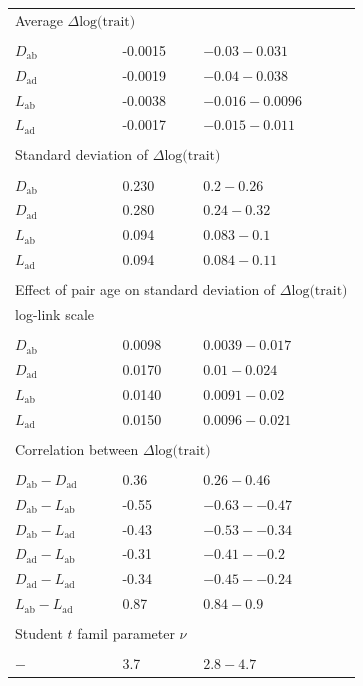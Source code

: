 \documentclass[
  10pt,
]{article}
\begin{document}
\begin{table}[ht]
\begin{center}
\begin{tabular}{lll}
  \multicolumn{3}{l}{Average $\Delta \text{log(trait)}$} \\
  \\
  $D_\mathrm{ab}$ & -0.0015  & $-0.03-0.031$  \\
  $D_\mathrm{ad}$ & -0.0019  & $-0.04-0.038$  \\
  $L_\mathrm{ab}$ & -0.0038  & $-0.016-0.0096$  \\
  $L_\mathrm{ad}$ & -0.0017  & $-0.015-0.011$  \\
  \\
  \multicolumn{3}{l}{Standard deviation of $\Delta \text{log(trait)}$} \\
  \\
  $D_\mathrm{ab}$ & 0.230  & $0.2-0.26$  \\
  $D_\mathrm{ad}$ & 0.280  & $0.24-0.32$  \\
  $L_\mathrm{ab}$ & 0.094  & $0.083-0.1$  \\
  $L_\mathrm{ad}$ & 0.094  & $0.084-0.11$  \\
  \\
  \multicolumn{3}{l}{Effect of pair age on standard deviation of $\Delta \text{log(trait)}$} \\
  \multicolumn{3}{l}{log-link scale} \\
  \\
  $D_\mathrm{ab}$ & 0.0098  & $0.0039-0.017$  \\
  $D_\mathrm{ad}$ & 0.0170  & $0.01-0.024$  \\
  $L_\mathrm{ab}$ & 0.0140  & $0.0091-0.02$  \\
  $L_\mathrm{ad}$ & 0.0150  & $0.0096-0.021$  \\
  \\
  \multicolumn{3}{l}{Correlation between $\Delta \text{log(trait)}$} \\
  \\
  $D_\mathrm{ab}-D_\mathrm{ad}$ & 
   0.36  & $0.26-0.46$  \\
  $D_\mathrm{ab}-L_\mathrm{ab}$ & 
  -0.55  & $-0.63--0.47$  \\
  $D_\mathrm{ab}-L_\mathrm{ad}$ & 
  -0.43  & $-0.53--0.34$  \\
  $D_\mathrm{ad}-L_\mathrm{ab}$ & 
  -0.31  & $-0.41--0.2$  \\
  $D_\mathrm{ad}-L_\mathrm{ad}$ & 
  -0.34  & $-0.45--0.24$  \\
  $L_\mathrm{ab}-L_\mathrm{ad}$ & 
   0.87  & $0.84-0.9$  \\
  \\
  \multicolumn{3}{l}{Student $t$ famil parameter $\nu$} \\
  \\
  $-$ & 3.7  & $2.8-4.7$  \\

\bottomrule

\end{tabular}
\end{center}
\end{table}
\end{document}
